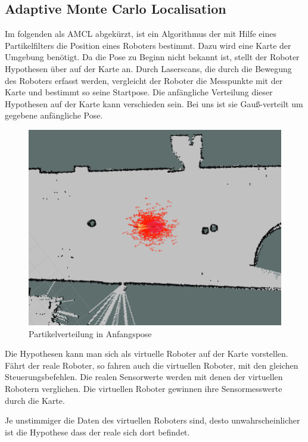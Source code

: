 \documentclass[11pt,a4paper]{article}
\begin{document}
{{	}
\subsection{Adaptive  Monte Carlo Localisation \cite{mclWiki}}
Im folgenden als AMCL abgek\"urzt, ist ein Algorithmus der mit Hilfe eines Partikelfilters die Position eines Roboters bestimmt. Dazu wird eine Karte der Umgebung ben\"otigt. Da die Pose zu Beginn nicht bekannt ist, stellt der Roboter Hypothesen \"uber auf der Karte an. Durch Laserscans, die durch die Bewegung des Roboters erfasst werden, vergleicht der Roboter die Messpunkte mit der Karte und bestimmt so seine Startpose. Die anf\"angliche Verteilung dieser Hypothesen auf der Karte kann verschieden sein. 
Bei uns ist sie Gau{\ss}-verteilt um gegebene anfängliche Pose. 

\begin{figure}[h]
	\includegraphics[width=\linewidth]{pictures/initial_distribution.jpg}
	\caption{Partikelverteilung in Anfangspose}
\end{figure}

Die Hypothesen kann man sich als virtuelle Roboter auf der Karte vorstellen. F\"ahrt der reale Roboter, so fahren auch die virtuellen Roboter, mit den gleichen Steuerungsbefehlen. Die realen Sensorwerte werden mit denen der virtuellen Robotern verglichen. Die virtuellen Roboter gewinnen ihre Sensormesswerte durch die Karte.

Je unstimmiger die Daten des virtuellen Roboters sind, desto unwahrscheinlicher ist die Hypothese dass der reale sich dort befindet. 

}
\end{document}
